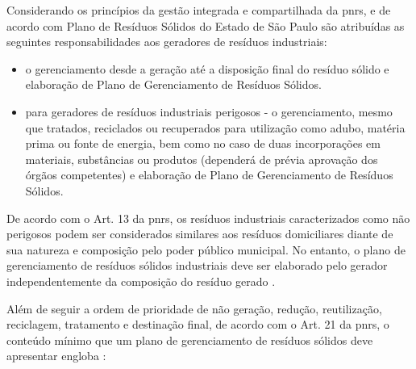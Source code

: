 	Considerando os princípios da gestão integrada e compartilhada da \gls{pnrs}, e de acordo com Plano de Resíduos Sólidos do Estado de São Paulo são atribuídas as seguintes responsabilidades aos geradores de resíduos industriais:
	
	\begin{itemize}
		\item o gerenciamento desde a geração até a disposição final do resíduo sólido e elaboração de Plano de Gerenciamento de Resíduos Sólidos.
		\item para geradores de resíduos industriais perigosos - o gerenciamento, mesmo que tratados, reciclados ou recuperados para utilização como adubo, matéria prima ou fonte de energia, bem como no caso de duas incorporações em materiais, substâncias ou produtos (dependerá de prévia aprovação dos órgãos competentes) e elaboração de Plano de Gerenciamento de Resíduos Sólidos.
	\end{itemize}

	De acordo com o Art. 13 da \gls{pnrs}, os resíduos industriais caracterizados como não perigosos podem ser considerados similares aos resíduos domiciliares diante de sua natureza e composição pelo poder público municipal. No entanto, o plano de gerenciamento de resíduos sólidos industriais deve ser elaborado pelo gerador independentemente da composição do resíduo gerado \cite{brasil:12305}.

	Além de seguir a ordem de prioridade de não geração, redução, reutilização, reciclagem, tratamento e destinação final, de acordo com o Art. 21 da \gls{pnrs}, o conteúdo mínimo que um plano de gerenciamento de resíduos sólidos deve apresentar engloba \cite{brasil:12305}:
	
